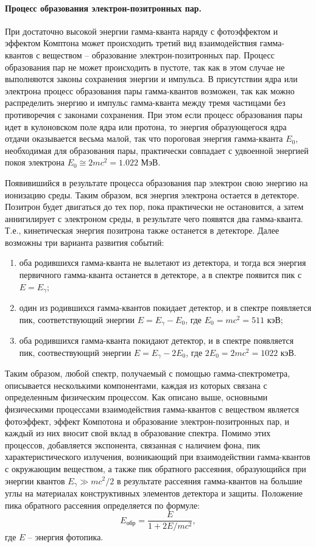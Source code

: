 \documentclass[a4paper, 12pt]{article}
\begin{document}
	\paragraph{Процесс образования электрон-позитронных пар.}
	При достаточно высокой энергии гамма-кванта наряду с фотоэффектом и эффектом Комптона может происходить третий вид взаимодействия гамма-квантов с веществом -- образование электрон-позитронных пар. Процесс образования пар не может происходить в пустоте, так как в этом случае не выполняются законы сохранения энергии и импульса. В присутствии ядра или электрона процесс образования пары гамма-квантов возможен, так как можно распределить энергию и импульс гамма-кванта между тремя частицами без противоречия с законами сохранения. При этом если процесс образования пары идет в кулоновском поле ядра или протона, то энергия образующегося ядра отдачи оказывается весьма малой, так что пороговая энергия гамма-кванта $E_0$, необходимая для образования пары, практически совпадает с удвоенной энергией покоя электрона $E_0\cong 2mc^2=1.022$ МэВ.\par
	Появивишийся в результате процесса образования пар электрон свою энергию на ионизацию среды. Таким образом, вся энергия электрона остается в детекторе. Позитрон будет двигаться до тех пор, пока практически не остановится, а затем аннигилирует с электроном среды, в результате чего появятся два гамма-кванта. Т.е., кинетическая энергия позитрона также останется в детекторе. Далее возможны три варианта развития событий:
	\begin{enumerate}
		\item оба родившихся гамма-кванта не вылетают из детектора, и тогда вся энергия первичного гамма-кванта останется в детекторе, а в спектре появится пик с $E=E_{\gamma}$;
		\item один из родившихся гамма-квантов покидает детектор, и в спектре появляется пик, соответствующий энергии $E=E_{\gamma}-E_0$, где $E_0=mc^2=511$ кэВ;
		\item оба родившихся гамма-кванта покидают детектор, и в спектре появляется пик, соотвествующий энергии $E=E_{\gamma}-2E_0$, где $2E_0=2mc^2=1022$ кэВ.
	\end{enumerate}
	Таким образом, любой спектр, получаемый с помощью гамма-спектрометра, описывается несколькими компонентами, каждая из которых связана с определенным физическим процессом. Как описано выше, основными физическими процессами взаимодействия гамма-квантов с веществом является фотоэффект, эффект Компотона и образование электрон-позитронных пар, и каждый из них вносит свой вклад в образование спектра. Помимо этих процессов, добавляется экспонента, связанная с наличием фона, пик характеристического излучения, возникающий при взаимодействии гамма-квантов с окружающим веществом, а также пик обратного рассеяния, образующийся при энергии квантов $E_{\gamma}\gg mc^2/2$ в результате рассеяния гамма-квантов на большие углы на материалах  конструктивных элементов детектора и защиты. Положение пика обратного рассеяния определяется по формуле:
	\begin{equation}
		E_{\text{обр}}=\frac{E}{1+2E/mc^2},
	\end{equation}
	 где $E$ -- энергия фотопика.\par
\end{document}
